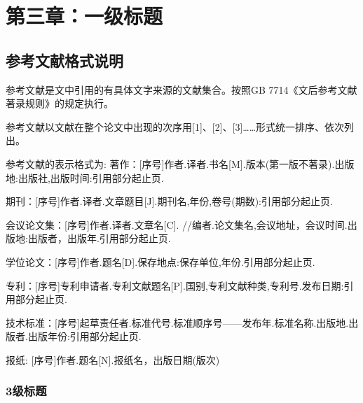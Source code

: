 \chapter{第三章：一级标题}
\label{cha:chap3}



\section{参考文献格式说明}

参考文献是文中引用的有具体文字来源的文献集合。按照GB 7714《文后参考文献著录规则》的规定执行。

参考文献以文献在整个论文中出现的次序用[1]、[2]、[3]……形式统一排序、依次列出。

参考文献的表示格式为:
著作：[序号]作者.译者.书名[M].版本(第一版不著录).出版地:出版社,出版时间:引用部分起止页.

期刊：[序号]作者.译者.文章题目[J].期刊名,年份,卷号(期数):引用部分起止页.

会议论文集：[序号]作者.译者.文章名[C]. //编者.论文集名,会议地址，会议时间.出版地:出版者，出版年.引用部分起止页.

学位论文：[序号]作者.题名[D].保存地点:保存单位,年份.引用部分起止页.

专利：[序号]专利申请者.专利文献题名[P].国别,专利文献种类,专利号.发布日期:引用部分起止页.

技术标准：[序号]起草责任者.标准代号.标准顺序号——发布年.标准名称.出版地.出版者.出版年份:引用部分起止页.

报纸: [序号]作者.题名[N].报纸名，出版日期(版次)



\subsection{3级标题}
